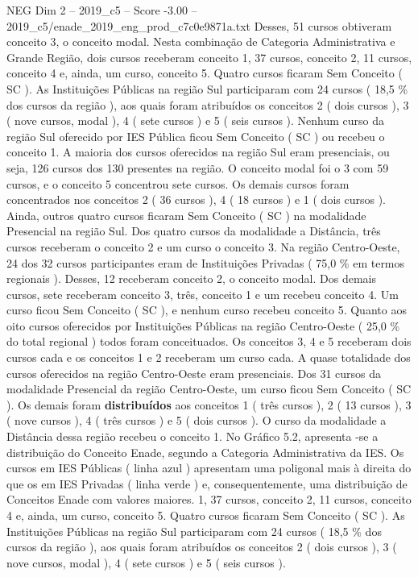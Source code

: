 \begin{textsample}{NEG Dim 2 – 2019\_c5 – Score -3.00 – 2019\_c5/enade\_2019\_eng\_prod\_c7c0e9871a.txt}
Desses, 51 cursos obtiveram conceito 3, o conceito modal.
Nesta combinação de Categoria Administrativa e Grande Região, dois cursos receberam conceito 1, 37 cursos, conceito 2, 11 cursos, conceito 4 e, ainda, um curso, conceito 5.
Quatro cursos ficaram Sem Conceito ( SC ).
As Instituições Públicas na região Sul participaram com 24 cursos ( 18,5 \% dos cursos da região ), aos quais foram atribuídos os conceitos 2 ( dois cursos ), 3 ( nove cursos, modal ), 4 ( sete cursos ) e 5 ( seis cursos ).
Nenhum curso da região Sul oferecido por IES Pública ficou Sem Conceito ( SC ) ou recebeu o conceito 1.
A maioria dos cursos oferecidos na região Sul eram presenciais, ou seja, 126 cursos dos 130 presentes na região.
O conceito modal foi o 3 com 59 cursos, e o conceito 5 concentrou sete cursos.
Os demais cursos foram concentrados nos conceitos 2 ( 36 cursos ), 4 ( 18 cursos ) e 1 ( dois cursos ).
Ainda, outros quatro cursos ficaram Sem Conceito ( SC ) na modalidade Presencial na região Sul.
Dos quatro cursos da modalidade a Distância, três cursos receberam o conceito 2 e um curso o conceito 3.
Na região Centro-Oeste, 24 dos 32 cursos participantes eram de Instituições Privadas ( 75,0 \% em termos regionais ).
Desses, 12 receberam conceito 2, o conceito modal.
Dos demais cursos, sete receberam conceito 3, três, conceito 1 e um recebeu conceito 4.
Um curso ficou Sem Conceito ( SC ), e nenhum curso recebeu conceito 5.
Quanto aos oito cursos oferecidos por Instituições Públicas na região Centro-Oeste ( 25,0 \% do total regional ) todos foram conceituados.
Os conceitos 3, 4 e 5 receberam dois cursos cada e os conceitos 1 e 2 receberam um curso cada.
A quase totalidade dos cursos oferecidos na região Centro-Oeste eram presenciais.
Dos 31 cursos da modalidade Presencial da região Centro-Oeste, um curso ficou Sem Conceito ( SC ).
Os demais foram \textbf{distribuídos} aos conceitos 1 ( três cursos ), 2 ( 13 cursos ), 3 ( nove cursos ), 4 ( três cursos ) e 5 ( dois cursos ).
O curso da modalidade a Distância dessa região recebeu o conceito 1.
No Gráfico 5.2, apresenta -se a distribuição do Conceito Enade, segundo a Categoria Administrativa da IES.
Os cursos em IES Públicas ( linha azul ) apresentam uma poligonal mais à direita do que os em IES Privadas ( linha verde ) e, consequentemente, uma distribuição de Conceitos Enade com valores maiores. 1, 37 cursos, conceito 2, 11 cursos, conceito 4 e, ainda, um curso, conceito 5.
Quatro cursos ficaram Sem Conceito ( SC ).
As Instituições Públicas na região Sul participaram com 24 cursos ( 18,5 \% dos cursos da região ), aos quais foram atribuídos os conceitos 2 ( dois cursos ), 3 ( nove cursos, modal ), 4 ( sete cursos ) e 5 ( seis cursos ).

\end{textsample}
